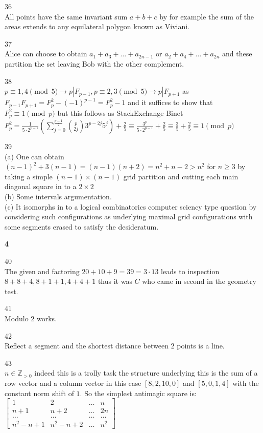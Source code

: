 36 \\
All points have the same invariant sum $a+b+c$ by for example the sum of the areas extends to any equilateral polygon known as Viviani.

37 \\
Alice can choose to obtain $a_1+a_3+\dots +a_{2n-1}$ or $a_2+a_4+\dots +a_{2n}$ and these partition the set leaving Bob with the other complement.

38 \\
$\boxed{p \equiv 1,4 \pmod{5} \to p|F_{p-1},p \equiv 2,3 \pmod{5} \to p|F_{p+1}}$ as $F_{p-1}F_{p+1}=F_p^2-(-1)^{p-1}=F_p^2-1$ and it suffices to show that $F_p^2 \equiv 1 \pmod{p}$ but this follows as StackExchange Binet $F_p^2=\frac{1}{5 \cdot 2^{p-1}} \left(\sum_{j=0}^{\frac{p-1}{2}}\binom{p}{2j}3^{p-2j}5^j \right) + \frac{2}{5} \equiv \frac{3^p}{5 \cdot 2^{p-1}}+\frac{2}{5} \equiv \frac{3}{5}+\frac{2}{5} \equiv 1 \pmod{p}$

39 \\
(a) One can obtain $(n-1)^2+3(n-1)=(n-1)(n+2)=n^2+n-2>n^2$ for $n \ge 3$ by taking a simple $(n-1) \times (n-1)$ grid partition and cutting each main diagonal square in to a $2 \times 2$ \\
(b) Some intervals argumentation. \\
(c) It isomorphs in to a logical combinatorics computer sciency type question by considering such configurations as underlying maximal grid configurations with some segments erased to satisfy the desideratum.

\newpage

\textbf{4}

40 \\
The given and factoring $20+10+9=39=3\cdot 13$ leads to inspection $8+8+4,8+1+1,4+4+1$ thus it was $\boxed{C}$ who came in second in the geometry test.

41 \\
Modulo $2$ works.

42 \\
Reflect a segment and the shortest distance between $2$ points is a line.

43 \\
$\boxed{n \in \mathbb{Z}_{>0}}$ indeed this is a trolly task the structure underlying this is the sum of a row vector and a column vector in this case $[8,2,10,0]$ and $[5,0,1,4]$ with the constant norm shift of $1$. So the simplest antimagic square is: \\
$
\begin{bmatrix}
1 & 2 & \dots & n \\
n+1 & n+2 & \dots & 2n \\
\dots & \dots & \dots & \dots \\
n^2-n+1 & n^2-n+2 & \dots & n^2
\end{bmatrix}
$

